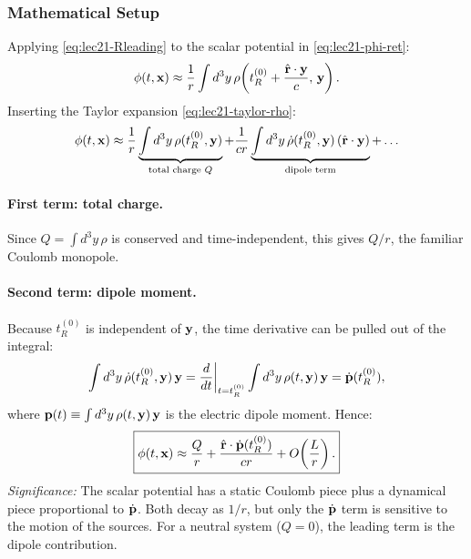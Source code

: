 \subsubsection*{Mathematical Setup}
Applying \eqref{eq:lec21-Rleading} to the scalar potential in \eqref{eq:lec21-phi-ret}:
\begin{equation}\label{eq:lec21-phi-step1}
  \phi(t,\mathbf{x}) \approx \frac{1}{r}
  \int d^3y\,\rho\!\left(t_R^{(0)}+\frac{\hat{\mathbf{r}}\cdot\mathbf{y}}{c},\,\mathbf{y}\right).
\end{equation}
Inserting the Taylor expansion \eqref{eq:lec21-taylor-rho}:
\begin{equation}\label{eq:lec21-phi-taylor}
  \phi(t,\mathbf{x}) \approx
  \frac{1}{r}\underbrace{\int d^3y\,\rho(t_R^{(0)},\mathbf{y})}_{\text{total charge }Q}
  + \frac{1}{cr}\underbrace{\int d^3y\,\dot\rho(t_R^{(0)},\mathbf{y})\,(\hat{\mathbf{r}}\cdot\mathbf{y})}_{\text{dipole term}}
  + \ldots
\end{equation}

\paragraph{First term: total charge.}
Since $Q = \int d^3y\,\rho$ is conserved and time-independent, this gives $Q/r$,
the familiar Coulomb monopole.

\paragraph{Second term: dipole moment.}
Because $t_R^{(0)}$ is independent of $\mathbf{y}$, the time derivative can be pulled
out of the integral:
\[
  \int d^3y\,\dot\rho(t_R^{(0)},\mathbf{y})\,\mathbf{y}
  = \frac{d}{dt}\bigg|_{t=t_R^{(0)}}\int d^3y\,\rho(t,\mathbf{y})\,\mathbf{y}
  = \dot{\mathbf{p}}(t_R^{(0)}),
\]
where $\mathbf{p}(t) \equiv \int d^3y\,\rho(t,\mathbf{y})\,\mathbf{y}$ is the electric dipole
moment. Hence:
\begin{equation}\label{eq:lec21-phi-far}
  \boxed{\phi(t,\mathbf{x}) \approx \frac{Q}{r}
  + \frac{\hat{\mathbf{r}}\cdot\dot{\mathbf{p}}(t_R^{(0)})}{cr}
  + O\!\left(\frac{L}{r}\right).}
\end{equation}
\textit{Significance:} The scalar potential has a static Coulomb piece plus a dynamical
piece proportional to $\dot{\mathbf{p}}$. Both decay as $1/r$, but only the
$\dot{\mathbf{p}}$ term is sensitive to the motion of the sources. For a neutral system
($Q=0$), the leading term is the dipole contribution.


